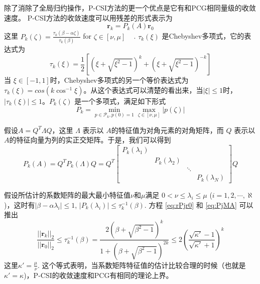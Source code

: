  
除了消除了全局归约操作，P-CSI方法的更一个优点是它有和PCG相同量级的收敛速度。 
P-CSI方法的收敛速度可以用残差的形式表示为
\begin{equation}
\textbf{r}_k = P_k(A)\textbf{r}_0 \label{eq:rPjr0}
\end{equation}
这里
$P_k(\zeta) = \frac{\tau_k(\beta-\alpha \zeta)}{\tau_k(\beta)}$ for $ \zeta \in [\nu, \mu]$ ~\cite{stiefel1958kernel} .
$\tau_k(\xi)$ 是Chebyshev多项式，它的表达式为  
\begin{equation}
\tau_k(\xi) =   \frac{1}{2}[(\xi+\sqrt{\xi^2-1})^k+(\xi+\sqrt{\xi^2-1})^{-k}]
\end{equation}
当 $ \xi \in [-1,1]$时，Chebyshev多项式的另一个等价表达式为$\tau_k(\xi) = cos(k\cos^{-1} \xi)$。从这个表达式可以清楚的看出来，当$| \xi | \le 1$时，$|\tau_k(\xi)| \le 1$。$P_k(\zeta)$ 是一个多项式，满足如下形式
\begin{equation}
P_k = \min_{p\in \mathcal{P}_k, p(0) = 1 }\max_{\zeta \in [\nu,\mu]} |p(\zeta)|
\end{equation}

假设$A= Q^T\Lambda Q$，这里 $\Lambda$ 表示以  $A$的特征值为对角元素的对角矩阵，而 $Q$ 表示以  $A$的特征向量为列的实正交矩阵。于是，我们可以得到
\begin{equation}
P_k(A) = Q^T P_k(\Lambda)Q = Q^T \left [\begin{array}{cccc}
P_k(\lambda_1) & & &\\
& P_k(\lambda_2) & &\\
& & \ddots &\\
 & & & P_k(\lambda_N)
\end{array} \right ] Q \label{eq:PjMA}
\end{equation}
 
假设所估计的系数矩阵的最大最小特征值$\nu$和$\mu$满足 $0 < \nu \le \lambda_i \le \mu$ ($i = 1, 2, \cdots, \aleph$)，这时有$|\beta - \alpha \lambda_i| \le 1$, $|P_k(\lambda_i)| \le \tau^{-1}_k (\beta)$.
方程 \ref{eq:rPjr0} 和 \ref{eq:PjMA} 可以推出
\begin{equation}
\label{pcsi_convergence}
\frac{||\textbf{r}_k||_2}{||\textbf{r}_0||_2}  \le  \tau_k^{-1}(\beta) = \frac{2(\beta+\sqrt{\beta^2-1})^k}{1+(\beta+\sqrt{\beta^2-1})^{2k}} \le 2(\frac{\sqrt{\kappa'}-1}{\sqrt{\kappa'}+1})^k
\end{equation}
这里$\kappa' = \frac{\mu}{\nu}$.
这个等式表明，当系数矩阵特征值的估计比较合理的时候（也就是$\kappa' =\kappa$)，P-CSI的收敛速度和PCG有相同的理论上界。



